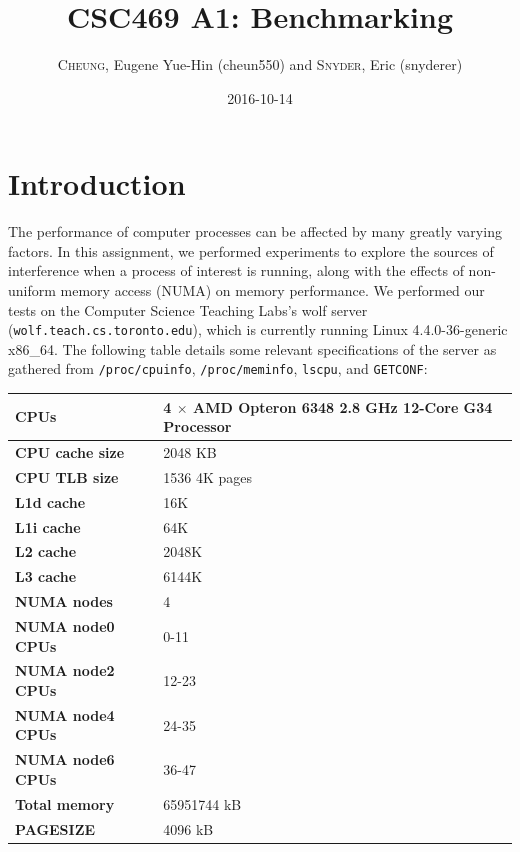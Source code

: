 \documentclass[11pt,twoside]{article}
\newcommand{\inlinecode}{\texttt}
\begin{document}
\title{CSC469 A1: Benchmarking}
\author{\textsc{Cheung}, Eugene Yue-Hin (cheun550) and \textsc{Snyder}, Eric (snyderer)}
\date{2016-10-14}
\maketitle


\section{Introduction}
The performance of computer processes can be affected by many greatly varying factors. In this assignment, we performed experiments to explore the sources of interference when a process of interest is running, along with the effects of non-uniform memory access (NUMA) on memory performance. We performed our tests on the Computer Science Teaching Labs's wolf server (\inlinecode{wolf.teach.cs.toronto.edu}), which is currently running Linux 4.4.0-36-generic x86\_64. The following table details some relevant specifications of the server as gathered from \inlinecode{/proc/cpuinfo}, \inlinecode{/proc/meminfo}, \inlinecode{lscpu}, and \inlinecode{GETCONF}:

\begin{table}[!htbp]
    \centering
    \renewcommand{\arraystretch}{1.2}
    \begin{tabular}{|l|l|}
    \hline
    \textbf{CPUs} & 4 $\times$ AMD Opteron 6348 2.8 GHz 12-Core G34 Processor \\
    \hline
    \textbf{CPU cache size} & 2048 KB \\
    \hline
    \textbf{CPU TLB size} & 1536 4K pages \\
    \hline
    \textbf{L1d cache} & 16K \\
    \hline
    \textbf{L1i cache} & 64K \\
    \hline
    \textbf{L2 cache} & 2048K \\
    \hline
    \textbf{L3 cache} & 6144K \\
    \hline
    \textbf{NUMA nodes} & 4 \\
    \hline
    \textbf{NUMA node0 CPUs} & 0-11 \\
    \hline
    \textbf{NUMA node2 CPUs} & 12-23 \\
    \hline
    \textbf{NUMA node4 CPUs} & 24-35 \\
    \hline
    \textbf{NUMA node6 CPUs} & 36-47 \\
    \hline
    \textbf{Total memory} & 65951744 kB \\
    \hline
    \textbf{PAGESIZE} & 4096 kB \\
    \hline
    \end{tabular}
\end{table}
\end{document}
